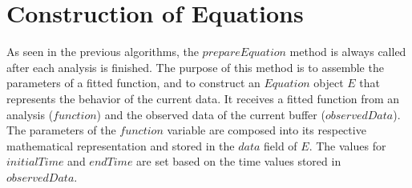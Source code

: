 \section{Construction of Equations}
%
As seen in the previous algorithms, the $prepareEquation$ method is always called after each analysis is finished. 
%
The purpose of this method is to assemble the parameters of a fitted function, and to construct an $Equation$ object $E$ that represents the behavior of the current data.
%
It receives a fitted function from an analysis ($function$) and the observed data of the current buffer ($observedData$).
The parameters of the $function$ variable are composed into its respective mathematical representation and stored in the $data$ field of $E$.
The values for $initialTime$ and $endTime$ are set based on the time values stored in $observedData$. 
%
%
%
%
%
%
%
%
%


